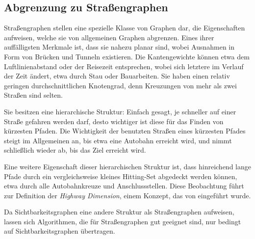 \subsection{Abgrenzung zu Straßengraphen}\label{graphs:strassengraphen}

Straßengraphen stellen eine spezielle Klasse von Graphen dar, die Eigenschaften aufweisen, welche sie von allgemeinen Graphen abgrenzen.
Eines ihrer auffälligsten Merkmale ist, dass sie nahezu planar sind, wobei Ausnahmen in Form von Brücken und Tunneln existieren.
Die Kantengewichte können etwa dem Luftlinienabstand oder der Reisezeit entsprechen, wobei sich letztere im Verlauf der Zeit ändert, etwa durch Stau oder Bauarbeiten.
Sie haben einen relativ geringen durchschnittlichen Knotengrad, denn Kreuzungen von mehr als zwei Straßen sind selten.

Sie besitzen eine hierarchische Struktur: Einfach gesagt, je schneller auf einer Straße gefahren werden darf, desto wichtiger ist diese für das Finden von kürzesten Pfaden.
Die Wichtigkeit der benutzten Straßen eines kürzesten Pfades steigt im Allgemeinen an, bis etwa eine Autobahn erreicht wird, und nimmt schließlich wieder ab, bis das Ziel erreicht wird.

Eine weitere Eigenschaft dieser hierarchischen Struktur ist, dass hinreichend lange Pfade durch ein vergleichsweise kleines Hitting-Set abgedeckt werden können, etwa durch alle Autobahnkreuze und Anschlussstellen.
Diese Beobachtung führt zur Definition der \emph{Highway Dimension}, einem Konzept, das von \cite{abraham2010highway} eingeführt wurde.

Da Sichtbarkeitsgraphen eine andere Struktur als Straßengraphen aufweisen, lassen sich Algorithmen, die für Straßengraphen gut geeignet sind, nur bedingt auf Sichtbarkeitsgraphen übertragen.

